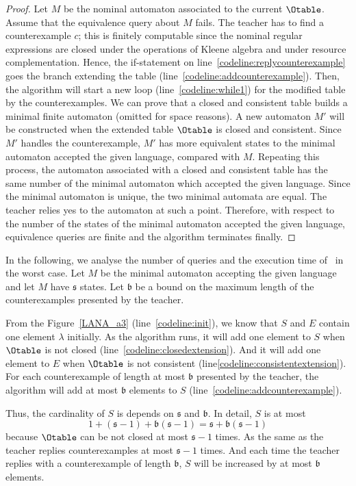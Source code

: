 \begin{proof}
  Let $M$ be the nominal automaton associated to the current \nOtable
  $\Otable$. Assume that the equivalence query about $M$ fails. The
  teacher has to find a counterexample $c$; this is finitely
  computable since the nominal regular expressions are closed under
  the operations of Kleene algebra and under resource complementation.
  Hence, the if-statement on line~\ref{codeline:replycounterexample}
  goes the branch extending the table
  (line~\ref{codeline:addcounterexample}). Then, the algorithm will
  start a new loop (line~\ref{codeline:while1}) for the modified table
  by the counterexamples.
  We can prove that a closed and consistent table builds a minimal
  finite automaton (omitted for space reasons).
  A new automaton $M'$ will be constructed when the extended table
  $\Otable$ is closed and consistent. Since $M'$ handles the
  counterexample, $M'$ has more equivalent states to the minimal
  automaton accepted the given language, compared with $M$. Repeating
  this process, the automaton associated with a closed and consistent
  table has the same number of the minimal automaton which accepted
  the given language. Since the minimal automaton is unique, the two
  minimal automata are equal. The teacher relies yes to the automaton
  at such a point. Therefore, with respect to the number of the states
  of the minimal automaton accepted the given language, equivalence
  queries are finite and the algorithm terminates finally.
\end{proof}

In the following, we analyse the number of queries and the execution
time of \nlstar\ in the worst case. Let $M$ be the minimal automaton
accepting the given language and let $M$ have $\mathfrak{s}$ states.
% 
Let $\mathfrak{b}$ be a bound on the maximum length of the
counterexamples presented by the teacher.

From the Figure~\ref{LANA_a3} (line~\ref{codeline:init}), we know that $S$ and $E$ contain one element $\lambda$ initially. As the algorithm runs, it will add one element to $S$ when $\Otable$ is not closed (line~\ref{codeline:closedextension}). And it will add one element to $E$ when $\Otable$ is not consistent (line\ref{codeline:consistentextension}). For each counterexample of length at most $\mathfrak{b}$ presented by the teacher, the algorithm will add at most $\mathfrak{b}$ elements to $S$ (line~\ref{codeline:addcounterexample}).

Thus, the cardinality of $S$ is depends on $\mathfrak{s}$ and $\mathfrak{b}$. In detail, $S$ is at most $$1+(\mathfrak{s}-1)+\mathfrak{b}(\mathfrak{s}-1)=\mathfrak{s}+\mathfrak{b}(\mathfrak{s}-1)$$ because $\Otable$ can be not closed at most $\mathfrak{s}-1$ times. As the same as the teacher replies counterexamples at most $\mathfrak{s}-1$ times. And each time the teacher replies with a counterexample of length $\mathfrak{b}$, $S$ will be increased by at most $\mathfrak{b}$ elements. 

